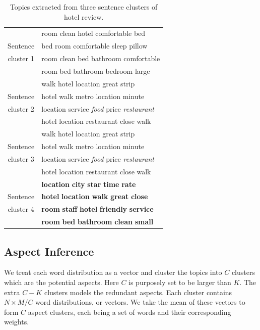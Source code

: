 \begin{table}[th]
\centering
\caption{Topics extracted from three sentence clusters of hotel review.}
\label{table:overlap}
\begin{tabular}{|c|l|}
\hline
& room clean hotel comfortable bed \\
Sentence
& bed room comfortable sleep pillow \\
cluster 1
& room clean bed bathroom comfortable \\
& room bed bathroom bedroom large \\\hline

& walk hotel location great strip \\
Sentence
& hotel walk metro location minute\\
cluster 2
& location service \textit{food} price \textit{restaurant} \\
& hotel location restaurant close walk \\\hline

& walk hotel location great strip \\
Sentence
& hotel walk metro location minute\\
cluster 3
& location service \textit{food} price \textit{restaurant} \\
& hotel location restaurant close walk \\\hline

& \textbf{location} \textbf{city} \textbf{star} \textbf{time} \textbf{rate} \\
Sentence
& \textbf{hotel} \textbf{location} \textbf{walk} \textbf{great} \textbf{close} \\
cluster 4
& \textbf{room} \textbf{staff} \textbf{hotel} \textbf{friendly} \textbf{service} \\
& \textbf{room} \textbf{bed} \textbf{bathroom} \textbf{clean} \textbf{small} \\\hline
\end{tabular}
\end{table}


\subsection{Aspect Inference}
\label{sec:topic_clustering}

We treat each word distribution as a vector and cluster the topics 
into $C$ clusters which are the potential aspects. 
Here $C$ is purposely set to be larger than $K$. The extra
$C-K$ clusters models the redundant aspects.
Each cluster contains $N\times M / C$ word distributions, or vectors.
We take the mean of these vectors to form $C$ aspect clusters,
each being a set of words and their corresponding weights.

